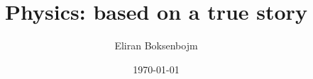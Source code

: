 \documentclass[10pt,a4paper,titlepage,openany]{book}
\title{Physics: based on a true story}
\date{\today}
\author{Eliran Boksenbojm}
\begin{document}
 
%
\newcommand\bigangle[2][]{%
    \draw[->,domain=0:#2,variable=\t,samples=200,>=latex,#1]
      plot ({(\t+#2)*cos(\t)/(#2)},{(\t+#2)*sin(\t)/(#2)}) 
			node[right=.5cm] {$#2^\circ$};
		}

\frontmatter

\begingroup
\renewcommand{\thetable}{\Roman{table}}

\endgroup

\maketitle

\tableofcontents


%

\mainmatter








%
%
\appendix
%

%
\end{document}
